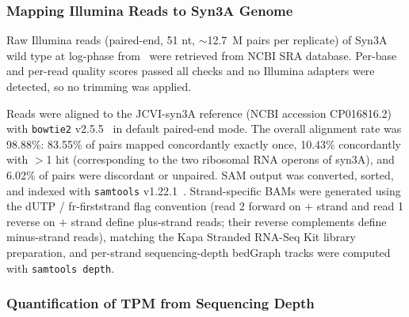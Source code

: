 \subsubsection{Mapping Illumina Reads to Syn3A Genome}

Raw Illumina reads (paired-end, 51 nt, $\sim$12.7~M pairs per replicate) of Syn3A wild type at log-phase from~\cite{sandberg_adaptive_2023} were retrieved from NCBI SRA database.
Per-base and per-read quality scores passed all checks and no Illumina adapters were detected, so no trimming was applied.


Reads were aligned to the JCVI-syn3A reference (NCBI accession CP016816.2) with \texttt{bowtie2} v2.5.5~\cite{langmead_fast_2012} in default paired-end mode.
The overall alignment rate was 98.88\%: 83.55\% of pairs mapped concordantly exactly once, 10.43\% concordantly with $>$1 hit (corresponding to the two ribosomal RNA operons of syn3A), and 6.02\% of pairs were discordant or unpaired.
SAM output was converted, sorted, and indexed with \texttt{samtools} v1.22.1~\cite{li_sequence_2009}.
Strand-specific BAMs were generated using the dUTP / fr-firststrand flag convention (read 2 forward on $+$ strand and read 1 reverse on $+$ strand define plus-strand reads; their reverse complements define minus-strand reads), matching the Kapa Stranded RNA-Seq Kit library preparation, and per-strand sequencing-depth bedGraph tracks were computed with \texttt{samtools depth}.

\subsubsection{Quantification of TPM from Sequencing Depth}

